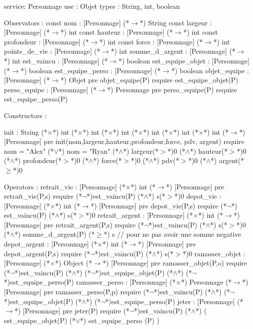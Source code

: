 \documentclass[a4paper, 11pt]{report}
\begin{document}
\begin{Spe}
service: Personnage
use : Objet
types : String, int, boolean

Observators : 
	const nom : [Personnage] (*$\rightarrow$*) String
	const largeur : [Personnage] (*$\rightarrow$*) int
	const hauteur : [Personnage] (*$\rightarrow$*) int
	const profondeur : [Personnage] (*$\rightarrow$*) int
	const force : [Personnage] (*$\rightarrow$*) int 
	points_de_vie : [Personnage] (*$\rightarrow$*) int
	somme_d_argent : [Personnage] (*$\rightarrow$*) int 
	est_vaincu : [Personnage] (*$\rightarrow$*) boolean 
	est_equipe_objet : [Personnage] (*$\rightarrow$*) boolean
	est_equipe_perso : [Personnage] (*$\rightarrow$*) boolean 
	objet_equipe : [Personnage] (*$\rightarrow$*) Objet
		pre objet_equipe(P) require est_equipe_objet(P)
	perso_equipe : [Personnage] (*$\rightarrow$*) Personnage
		pre perso_equipe(P) require est_equipe_perso(P) 

Constructors : 

	init : String (*$\times$*) int (*$\times$*) int (*$\times$*) int (*$\times$*) int (*$\times$*) int (*$\times$*) int (*$\rightarrow$*) [Personnage]
		pre init(nom,largeur,hauteur,profondeur,force, pdv, argent) require nom = "Alex" (*$\lor$*) nom = "Ryan" (*$\land$*) largeur(*$>$*)0 (*$\land$*) hauteur(*$>$*)0 (*$\land$*) profondeur(*$>$*)0 (*$\land$*) force(*$>$*)0 (*$\land$*) pdv(*$>$*)0 (*$\land$*) argent(*$\ge$*)0 

Operators :
	retrait_vie :  [Personnage] (*$\times$*) int (*$\rightarrow$*) [Personnage]
		pre retrait_vie(P,s) require (*$\lnot$*)est_vaincu(P) (*$\land$*) s(*$>$*)0
	depot_vie : [Personnage] (*$\times$*) int (*$\rightarrow$*) [Personnage]
		pre depot_vie(P,s) require (*$\lnot$*) est_vaincu(P) (*$\land$*) s(*$>$*)0
	retrait_argent :  [Personnage] (*$\times$*) int (*$\rightarrow$*) [Personnage]
		pre retrait_argent(P,s) require (*$\lnot$*)est_vaincu(P) (*$\land$*) s(*$>$*)0 (*$\land$*) somme_d_argent(P) (*$\ge$*) s // pour ne pas avoir une somme negative
	depot_argent : [Personnage] (*$\times$*) int (*$\rightarrow$*) [Personnage]
		pre depot_argent(P,s) require (*$\lnot$*)est_vaincu(P) (*$\land$*) s(*$>$*)0
	ramasser_objet : [Personnage] (*$\times$*) Object (*$\rightarrow$*) [Personnage]
		pre ramasser_objet(P,o) require (*$\lnot$*)est_vaincu(P) (*$\land$*) (*$\lnot$*)est_equipe_objet(P) (*$\land$*)  (*$\lnot$*)est_equipe_perso(P)
        ramasser_perso : [Personnage] (*$\times$*) Personnage (*$\rightarrow$*) [Personnage]
		pre ramasser_perso(P,p) require (*$\lnot$*)est_vaincu(P) (*$\land$*) (*$\lnot$*)est_equipe_objet(P) (*$\land$*) (*$\lnot$*)est_equipe_perso(P)
	jeter : [Personnage] (*$\rightarrow$*) [Personnage]
		pre jeter(P) require (*$\lnot$*)est_vaincu(P) (*$\land$*) ( est_equipe_objet(P) (*$\lor$*) est_equipe_perso (P) )


\end{Spe}
\end{document}
